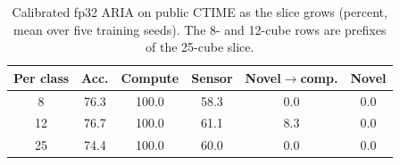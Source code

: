 \begin{table}[t]
\caption{Calibrated fp32 ARIA on public CTIME as the slice grows (percent, mean over five training seeds). The 8- and 12-cube rows are prefixes of the 25-cube slice.}
\label{tab:trend}
\centering
\small
\begin{tabular}{cccccc}
\toprule
Per class & Acc. & Compute & Sensor & Novel$\to$comp. & Novel \\
\midrule
8 & 76.3 & 100.0 & 58.3 & 0.0 & 0.0 \\
12 & 76.7 & 100.0 & 61.1 & 8.3 & 0.0 \\
25 & 74.4 & 100.0 & 60.0 & 0.0 & 0.0 \\
\bottomrule
\end{tabular}
\end{table}

